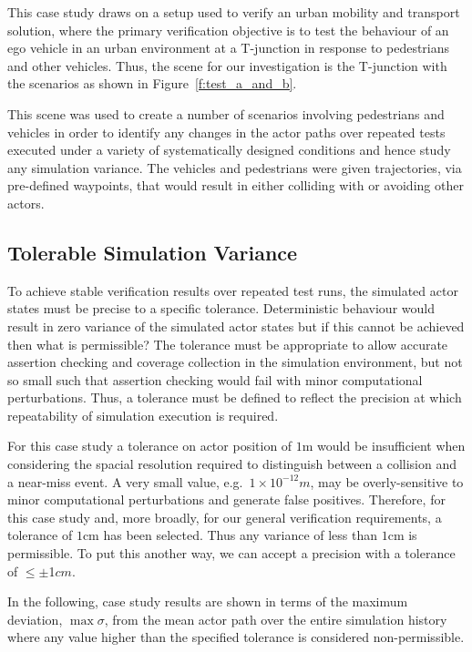 This case study draws on a setup used to verify an urban mobility and transport solution, where the primary verification objective is to test the behaviour of an ego vehicle in an urban environment at a T-junction in response to pedestrians and other vehicles. Thus, the scene for our investigation is the T-junction with the scenarios as shown in Figure~\ref{f:test_a_and_b}.

This scene was used to create a number of scenarios involving pedestrians and vehicles in order to identify any changes in the actor paths over repeated tests executed under a variety of systematically designed conditions and hence study any simulation variance. The vehicles and pedestrians were given trajectories, via pre-defined waypoints, that would result in either colliding with or avoiding other actors.

\subsection{Tolerable Simulation Variance}\label{s:tolerance}
To achieve stable verification results over repeated test runs, the simulated actor states must be precise to a specific tolerance. Deterministic behaviour would result in zero variance of the simulated actor states but if this cannot be achieved then what is permissible? The tolerance must be appropriate to allow accurate assertion checking and coverage collection in the simulation environment, but not so small such that assertion checking would fail with minor computational perturbations. Thus, a tolerance must be defined to reflect the precision at which repeatability of simulation execution is required. 

For this case study a tolerance on actor position of $1$m would be insufficient when considering the spacial resolution required to distinguish between a collision and a near-miss event. A very small value, e.g.\ $1\times10^{-12}m$, may be overly-sensitive to minor computational perturbations and generate false positives. Therefore, for this case study and, more broadly, for our general verification requirements, a tolerance of $1$cm has been selected. Thus any variance of less than $1$cm is permissible. To put this another way, we can accept a precision with a tolerance of $\leq$$\pm$1$cm$. 

In the following, case study results are shown in terms of the maximum deviation, $\max\sigma$, from the mean actor path over the entire simulation history where any value higher than the specified tolerance is considered non-permissible.


